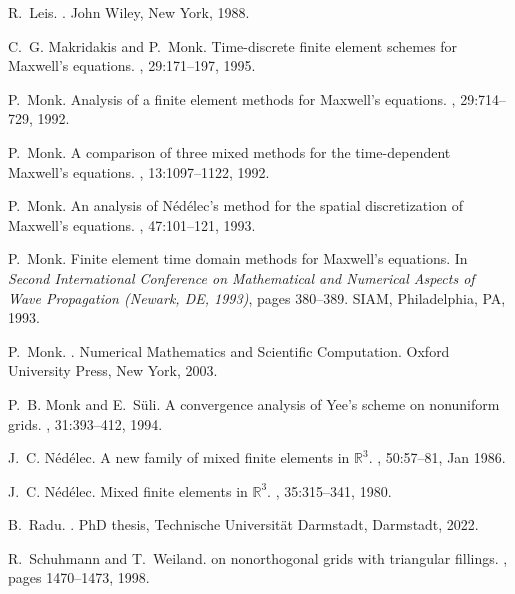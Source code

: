 \documentclass[12pt,reqno,a4paper]{amsart}
\theoremstyle{definition}
\begin{document}
\begin{thebibliography}{10}
R.~Leis.
.
\newblock John Wiley, New York, 1988.

C.~G. Makridakis and P.~Monk.
\newblock Time-discrete finite element schemes for {M}axwell's equations.
, 29:171--197, 1995.

P.~Monk.
\newblock Analysis of a finite element methods for {M}axwell's equations.
, 29:714--729, 1992.

P.~Monk.
\newblock A comparison of three mixed methods for the time-dependent
  {M}axwell's equations.
, 13:1097--1122, 1992.

P.~Monk.
\newblock An analysis of {N}\'{e}d\'{e}lec's method for the spatial
  discretization of {M}axwell's equations.
, 47:101--121, 1993.

P.~Monk.
\newblock Finite element time domain methods for {M}axwell's equations.
\newblock In {\em Second {I}nternational {C}onference on {M}athematical and
  {N}umerical {A}spects of {W}ave {P}ropagation ({N}ewark, {DE}, 1993)}, pages
  380--389. SIAM, Philadelphia, PA, 1993.

P.~Monk.
.
\newblock Numerical Mathematics and Scientific Computation. Oxford University
  Press, New York, 2003.

P.~B. Monk and E.~S{\"u}li.
\newblock A convergence analysis of {Yee}'s scheme on nonuniform grids.
, 31:393--412, 1994.

J.~C. N{\'e}d{\'e}lec.
\newblock A new family of mixed finite elements in $\mathbb{R}^3$.
, 50:57--81, Jan 1986.

J.~C. Nédélec.
\newblock Mixed finite elements in $\mathbb{R}^3$.
, 35:315--341, 1980.

B.~Radu.
.
\newblock PhD thesis, Technische Universit{\"a}t Darmstadt, Darmstadt, 2022.

R.~Schuhmann and T.~Weiland.
 on nonorthogonal grids with triangular fillings.
, pages 1470--1473, 1998.


\end{thebibliography}
\end{document}
